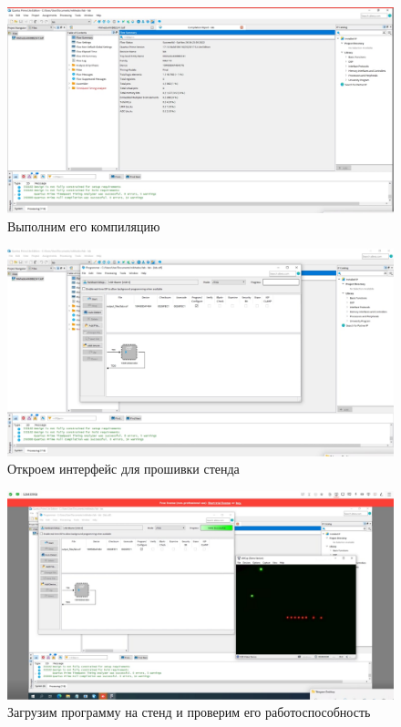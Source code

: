 \documentclass[a4paper,12pt]{article}
\begin{document}
  \begin{figure}[H]
    \centering
    \includegraphics[width=12cm]{01_22}
    \caption{Выполним его компиляцию}
  \end{figure}

  \begin{figure}[H]
    \centering
    \includegraphics[width=12cm]{01_23}
    \caption{Откроем интерфейс для прошивки стенда}
  \end{figure}  

  \begin{figure}[H]
    \centering
    \includegraphics[width=12cm]{01_24}
    \caption{Загрузим программу на стенд и проверим его работоспособность}
  \end{figure}  
\end{document}
